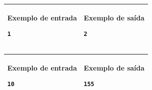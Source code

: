 \begin{table}[!h]
\centering
\begin{tabular}{|l|l|}
\hline
\begin{minipage}[t]{3in}
\textbf{Exemplo de entrada}
\begin{verbatim}
1
\end{verbatim}
\vspace{1mm}
\end{minipage}
&
\begin{minipage}[t]{3in}
\textbf{Exemplo de saída}
\begin{verbatim}
2
\end{verbatim}
\vspace{1mm}
\end{minipage} \\
\hline
\end{tabular}
\end{table}
\begin{table}[!h]
\centering
\begin{tabular}{|l|l|}
\hline
\begin{minipage}[t]{3in}
\textbf{Exemplo de entrada}
\begin{verbatim}
10
\end{verbatim}
\vspace{1mm}
\end{minipage}
&
\begin{minipage}[t]{3in}
\textbf{Exemplo de saída}
\begin{verbatim}
155
\end{verbatim}
\vspace{1mm}
\end{minipage} \\
\hline
\end{tabular}
\end{table}
